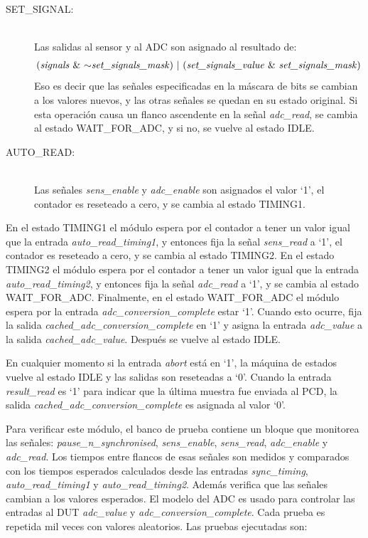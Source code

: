\documentclass[a4paper, twoside, 11pt]{report}
\begin{document}
\newpage

\begin{description}
  \item[SET\_SIGNAL:] \hfill \\ Las salidas al sensor y al ADC son asignado al resultado de:
  \begin{align*}
      \text{(\textit{signals} \& $\sim$\textit{set\_signals\_mask}) $\vert$ (\textit{set\_signals\_value} \& \textit{set\_signals\_mask})}
  \end{align*}
  Eso es decir que las señales especificadas en la máscara de bits se cambian a los valores nuevos, y las otras señales se quedan en su estado original. Si esta operación causa un flanco ascendente en la señal \textit{adc\_read}, se cambia al estado WAIT\_FOR\_ADC, y si no, se vuelve al estado IDLE.
  \item[AUTO\_READ:] \hfill \\ Las señales \textit{sens\_enable} y \textit{adc\_enable} son asignados el valor ‘1’, el contador es reseteado a cero, y se cambia al estado TIMING1.
\end{description}

En el estado TIMING1 el módulo espera por el contador a tener un valor igual que la entrada \textit{auto\_read\_timing1}, y entonces fija la señal \textit{sens\_read} a ‘1’, el contador es reseteado a cero, y se cambia al estado TIMING2. En el estado TIMING2 el módulo espera por el contador a tener un valor igual que la entrada \textit{auto\_read\_timing2}, y entonces fija la señal \textit{adc\_read} a ‘1’, y se cambia al estado WAIT\_FOR\_ADC. Finalmente, en el estado WAIT\_FOR\_ADC el módulo espera por la entrada \textit{adc\_conversion\_complete} estar ‘1’. Cuando esto ocurre, fija la salida \textit{cached\_adc\_conversion\_complete} en ‘1’ y asigna la entrada \textit{adc\_value} a la salida \textit{cached\_adc\_value}. Después se vuelve al estado IDLE.

En cualquier momento si la entrada \textit{abort} está en ‘1’, la máquina de estados vuelve al estado IDLE y las salidas son reseteadas a ‘0’. Cuando la entrada \textit{result\_read} es ‘1’ para indicar que la última muestra fue enviada al PCD, la salida \textit{cached\_adc\_conversion\_complete} es asignada al valor ‘0’.

Para verificar este módulo, el banco de prueba contiene un bloque que monitorea las señales: \textit{pause\_n\_synchronised}, \textit{sens\_enable}, \textit{sens\_read}, \textit{adc\_enable} y \textit{adc\_read}. Los tiempos entre flancos de esas señales son medidos y comparados con los tiempos esperados calculados desde las entradas \textit{sync\_timing}, \textit{auto\_read\_timing1} y \textit{auto\_read\_timing2}. Además verifica que las señales cambian a los valores esperados. El modelo del ADC es usado para controlar las entradas al DUT \textit{adc\_value} y \textit{adc\_conversion\_complete}. Cada prueba es repetida mil veces con valores aleatorios. Las pruebas ejecutadas son:
\end{document}
